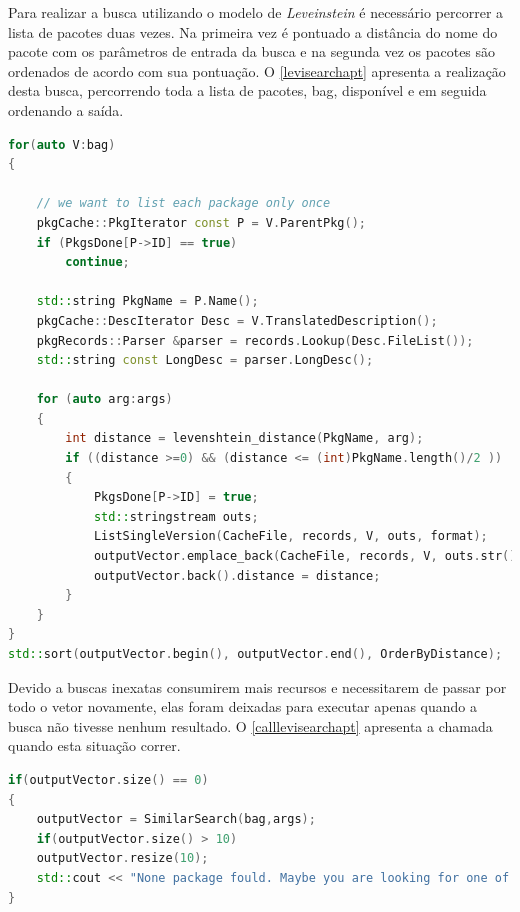 Para realizar a busca utilizando o modelo de \textit{Leveinstein} é necessário percorrer a lista de pacotes duas vezes. Na primeira vez é pontuado a distância do nome do pacote com os parâmetros de entrada da busca e na segunda vez os pacotes são ordenados de acordo com sua pontuação. O \autoref{levisearchapt} apresenta a realização desta busca, percorrendo toda a lista de pacotes, {\code bag}, disponível e em seguida ordenando a saída.

\begin{lstlisting}[language=C++,label=levisearchapt,caption={Busca ordenada por distância de \textit{Levenshtein}}]
for(auto V:bag)
{

	// we want to list each package only once
	pkgCache::PkgIterator const P = V.ParentPkg();
	if (PkgsDone[P->ID] == true)
		continue;

	std::string PkgName = P.Name();
	pkgCache::DescIterator Desc = V.TranslatedDescription();
	pkgRecords::Parser &parser = records.Lookup(Desc.FileList());
	std::string const LongDesc = parser.LongDesc();

	for (auto arg:args)
	{
		int distance = levenshtein_distance(PkgName, arg);
		if ((distance >=0) && (distance <= (int)PkgName.length()/2 ))
		{
			PkgsDone[P->ID] = true;
			std::stringstream outs;
			ListSingleVersion(CacheFile, records, V, outs, format);
			outputVector.emplace_back(CacheFile, records, V, outs.str());
			outputVector.back().distance = distance;
		}
	}
}
std::sort(outputVector.begin(), outputVector.end(), OrderByDistance);
\end{lstlisting}

Devido a buscas inexatas consumirem mais recursos e necessitarem de passar por todo o vetor novamente, elas foram deixadas para executar apenas quando a busca não tivesse nenhum resultado. O \autoref{calllevisearchapt} apresenta a chamada quando esta situação correr.

\begin{lstlisting}[language=C++,label=calllevisearchapt,caption={Chamada seletiva para buscas inexatas}]
if(outputVector.size() == 0)
{
	outputVector = SimilarSearch(bag,args);
	if(outputVector.size() > 10)
	outputVector.resize(10);
	std::cout << "None package fould. Maybe you are looking for one of those:" << std::endl;
}
\end{lstlisting}
